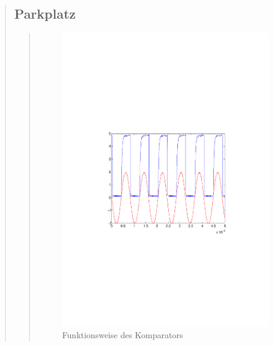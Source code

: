 \begin{quote}
\begin{quote}
        
        
    \end{quote}
    
    
    
    
    \subsection{Parkplatz}
    \begin{quote}
        
        
        \begin{figure}[H]
			\begin{center}
			\includegraphics[scale=0.7, trim = 35mm 100mm 35mm 95mm,clip]{Bilder/spraFunktionsweiseComparator}
			\end{center}
		\caption{Funktionsweise des Komparators}
		\label{fig:fct Com}
	    \end{figure}
        

\end{quote}
\end{quote}

